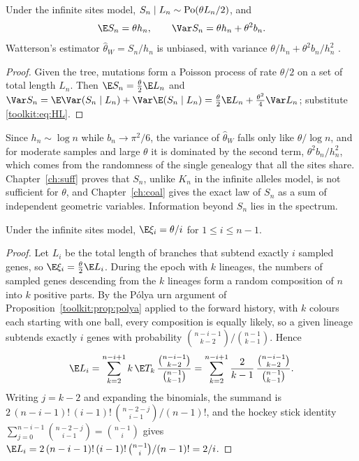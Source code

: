 \begin{theorem}\label{toolkit:thm:watterson}
Under the infinite sites model, $S_n\mid L_n\sim\mathrm{Po}(\theta L_n/2)$, and
\begin{equation}\label{toolkit:eq:Smoments}
\E S_n=\theta h_n,\qquad \Var S_n=\theta h_n+\theta^2b_n .
\end{equation}
Watterson's estimator $\hat\theta_W=S_n/h_n$ is unbiased, with variance
$\theta/h_n+\theta^2b_n/h_n^2$ \citep{toolkit:watterson1975}.
\end{theorem}

\begin{proof}
Given the tree, mutations form a Poisson process of rate $\theta/2$ on a set of total length
$L_n$. Then $\E S_n=\tfrac\theta2\E L_n$ and
$\Var S_n=\E\Var(S_n\mid L_n)+\Var\E(S_n\mid L_n)=\tfrac\theta2\E L_n+\tfrac{\theta^2}4\Var L_n$;
substitute \eqref{toolkit:eq:HL}.
\end{proof}

Since $h_n\sim\log n$ while $b_n\to\pi^2/6$, the variance of $\hat\theta_W$ falls only like
$\theta/\log n$, and for moderate samples and large $\theta$ it is dominated by the second term,
$\theta^2b_n/h_n^2$, which comes from the randomness of the single genealogy that all the sites
share. Chapter~\ref{ch:suff}
proves that $S_n$, unlike $K_n$ in the infinite alleles model, is not sufficient for $\theta$, and
Chapter~\ref{ch:coal} gives the exact law of $S_n$ as a sum of independent geometric variables.
Information beyond $S_n$ lies in the spectrum.

\begin{theorem}\label{toolkit:thm:sfs}
Under the infinite sites model, $\E\xi_i=\theta/i$ for $1\le i\le n-1$.
\end{theorem}

\begin{proof}
Let $L_i$ be the total length of branches that subtend exactly $i$ sampled genes, so
$\E\xi_i=\tfrac\theta2\E L_i$. During the epoch with $k$ lineages, the numbers of sampled genes
descending from the $k$ lineages form a random composition of $n$ into $k$ positive parts. By the
P\'olya urn argument of Proposition~\ref{toolkit:prop:polya} applied to the forward history,
with $k$ colours each starting with one ball, every composition is equally likely, so a given
lineage subtends exactly $i$ genes with probability
$\binom{n-i-1}{k-2}\big/\binom{n-1}{k-1}$. Hence
\[
\E L_i=\sum_{k=2}^{n-i+1}k\,\E T_k\,\frac{\binom{n-i-1}{k-2}}{\binom{n-1}{k-1}}
=\sum_{k=2}^{n-i+1}\frac{2}{k-1}\,\frac{\binom{n-i-1}{k-2}}{\binom{n-1}{k-1}} .
\]
Writing $j=k-2$ and expanding the binomials, the summand is
$2\,(n-i-1)!\,(i-1)!\,\binom{n-2-j}{i-1}/(n-1)!$, and the hockey stick identity
$\sum_{j=0}^{n-i-1}\binom{n-2-j}{i-1}=\binom{n-1}{i}$ gives
$\E L_i=2\,(n-i-1)!\,(i-1)!\,\binom{n-1}{i}/(n-1)!=2/i$.
\end{proof}

